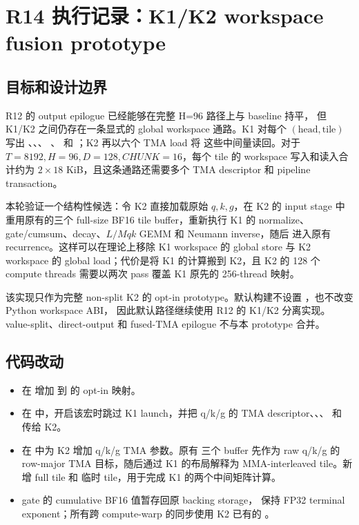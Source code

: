 \section{R14 执行记录：K1/K2 workspace fusion prototype}

\subsection{目标和设计边界}

R12 的 output epilogue 已经能够在完整 H=96 路径上与 baseline 持平，
但 K1/K2 之间仍存在一条显式的 global workspace 通路。K1 对每个
$(\text{head},\text{tile})$ 写出
、、、
、 和 ；K2 再以六个 TMA load 将
这些中间量读回。对于 $T=8192,H=96,D=128,CHUNK=16$，每个 tile 的
workspace 写入和读入合计约为 $2\times18$ KiB，且这条通路还需要多个
TMA descriptor 和 pipeline transaction。

本轮验证一个结构性候选：令 K2 直接加载原始 $q,k,g$，在 K2 的 input
stage 中重用原有的三个 full-size BF16 tile buffer，重新执行 K1 的
normalize、gate/cumsum、decay、$L/Mqk$ GEMM 和 Neumann inverse，随后
进入原有 recurrence。这样可以在理论上移除 K1 workspace 的 global
store 与 K2 workspace 的 global load；代价是将 K1 的计算搬到 K2，且
K2 的 128 个 compute threads 需要以两次 pass 覆盖 K1 原先的 256-thread
映射。

该实现只作为完整 non-split K2 的 opt-in prototype。默认构建不设置
，也不改变 Python workspace ABI，
因此默认路径继续使用 R12 的 K1/K2 分离实现。value-split、direct-output
和 fused-TMA epilogue 不与本 prototype 合并。

\subsection{代码改动}

\begin{itemize}
  \item 在  增加
         到
         的 opt-in 映射。
  \item 在  中，开启该宏时跳过 K1 launch，并把
        q/k/g 的 TMA descriptor、、、
         和  传给 K2。
  \item 在  中为 K2 增加 q/k/g TMA 参数。原有
         三个 buffer 先作为
        raw q/k/g 的 row-major TMA 目标，随后通过 K1 的布局解释为
        MMA-interleaved tile。新增  full tile 和 
        临时 tile，用于完成 K1 的两个中间矩阵计算。
  \item gate 的 cumulative BF16 值暂存回原  backing
        storage， 保持 FP32 terminal exponent；所有跨
        compute-warp 的同步使用 K2 已有的
        。
\end{itemize}

